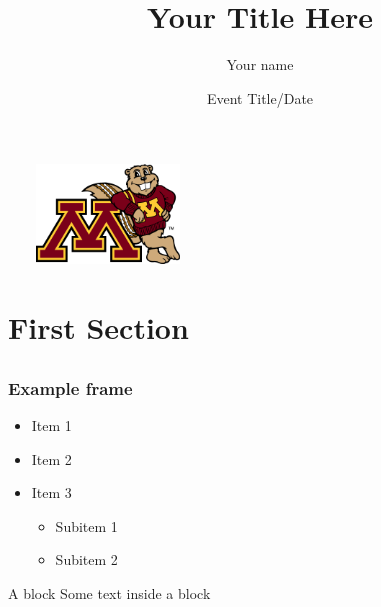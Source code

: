 \documentclass[10pt,xcolor=dvipsnames]{beamer}
\title[Short Title]{Your Title Here}
\author[Your name]{Your name}
\institute{Division of Biostatistics\\ University of Minnesota}
\date[Event]{Event Title/Date}
\begin{document}
\begin{frame}
\titlepage
\ \ \ \ \includegraphics[width=1.5in]{graphics/goldylean.png}
\end{frame}

\section[First Section]{First Section}
\subsection{}

\begin{frame}
\frametitle{Example frame}

\begin{itemize}
\item Item 1
\item Item 2
\item Item 3
\begin{itemize}
\item Subitem 1
\item Subitem 2
\end{itemize}
\end{itemize}

\pause

\begin{block}{A block}
Some text inside a block
\end{block}

\end{frame}

\end{document}
